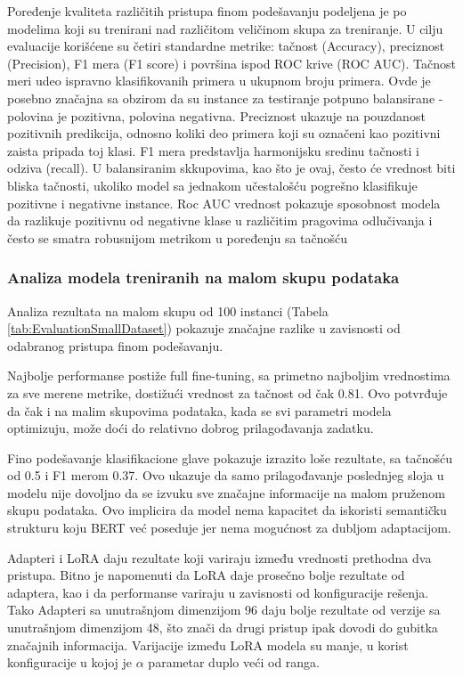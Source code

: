 \documentclass[12pt,oneside]{memoir}
\begin{document}
Poređenje kvaliteta različitih pristupa finom podešavanju podeljena je po modelima koji su trenirani nad različitom veličinom skupa za treniranje. U cilju evaluacije korišćene su četiri standardne metrike: tačnost (Accuracy), preciznost (Precision), F1 mera (F1 score) i površina ispod ROC krive (ROC AUC). Tačnost meri udeo ispravno klasifikovanih primera u ukupnom broju primera. Ovde je posebno značajna sa obzirom da su instance za testiranje potpuno balansirane - polovina je pozitivna, polovina negativna. Preciznost ukazuje na pouzdanost pozitivnih predikcija, odnosno koliki deo primera koji su označeni kao pozitivni zaista pripada toj klasi. F1 mera predstavlja harmonijsku sredinu tačnosti i odziva (recall). U balansiranim skkupovima, kao što je ovaj, često će vrednost biti bliska tačnosti, ukoliko model sa jednakom učestalošću pogrešno klasifikuje pozitivne i negativne instance. Roc AUC vrednost pokazuje sposobnost modela da razlikuje pozitivnu od negativne klase u različitim pragovima odlučivanja i često se smatra robusnijom metrikom u poređenju sa tačnošću

\subsubsection{Analiza modela treniranih na malom skupu podataka}

Analiza rezultata na malom skupu od 100 instanci (Tabela \ref{tab:EvaluationSmallDataset}) pokazuje značajne razlike u zavisnosti od odabranog pristupa finom podešavanju.

Najbolje performanse postiže full fine-tuning, sa primetno najboljim vrednostima za sve merene metrike, dostižući vrednost za tačnost od čak 0.81. Ovo potvrđuje da čak i na malim skupovima podataka, kada se svi parametri modela optimizuju, može doći do relativno dobrog prilagođavanja zadatku.  

Fino podešavanje klasifikacione glave pokazuje izrazito loše rezultate, sa tačnošću od 0.5 i F1 merom 0.37. Ovo ukazuje da samo prilagođavanje poslednjeg sloja u modelu nije dovoljno da se izvuku sve značajne informacije na malom pruženom skupu podataka. Ovo implicira da model nema kapacitet da iskoristi semantičku strukturu koju BERT već poseduje jer nema mogućnost za dubljom adaptacijom.

Adapteri i LoRA daju rezultate koji variraju između vrednosti prethodna dva pristupa. Bitno je napomenuti da LoRA daje prosečno bolje rezultate od adaptera, kao i da performanse variraju u zavisnosti od konfiguracije rešenja. Tako Adapteri sa unutrašnjom dimenzijom 96 daju bolje rezultate od verzije sa unutrašnjom dimenzijom 48, što znači da drugi pristup ipak dovodi do gubitka značajnih informacija. Varijacije između LoRA modela su manje, u korist konfiguracije u kojoj je \(\alpha\) parametar duplo veći od ranga. 
\end{document}
